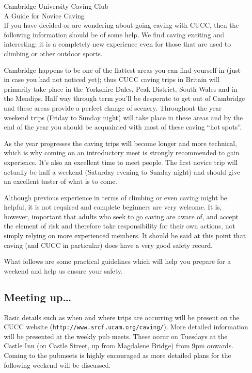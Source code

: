 \documentclass[a4paper,11pt]{article}
\begin{document}
{\titlefontsmall Cambridge University Caving Club}\smallskip\\
{\titlefont A Guide for Novice Caving}\medskip\\

If you have decided or are wondering about going caving with CUCC, then the
following information should be of some help.  We find caving exciting and
interesting; it is a completely new experience even for those that are used to
climbing or other outdoor sports.

Cambridge happens to be one of the flattest areas you can find yourself in
(just in case you had not noticed yet); thus CUCC caving trips in Britain will
primarily take place in the Yorkshire Dales, Peak District, South Wales and in
the Mendips.  Half way through term you'll be desperate to get out of Cambridge
and these areas provide a perfect change of scenery.  Throughout the year
weekend trips (Friday to Sunday night) will take place in these areas
and by the end of the year you should be acquainted with most of these caving
``hot spots''.

As the year progresses the caving trips will become longer and more technical,
which is why coming on an introductory meet is strongly recommended to gain
experience.  It's also an excellent time to meet people. The first novice trip
will actually be half a weekend (Saturday evening to Sunday night) and should
give an excellent taster of what is to come.

Although previous experience in terms of climbing or even caving might be
helpful, it is not required and complete beginners are very welcome.  It is,
however, important that adults who seek to go caving are aware of, and accept
the element of risk and therefore take responsibility for their own actions,
not simply relying on more experienced members.  It should be said at this point
that caving (and CUCC in particular) does have a very good safety record.

What follows are some practical guidelines which will help you prepare for a
weekend and help us ensure your safety.

\subsection*{Meeting up\ldots}

Basic details such as when and where trips are occurring will be present on the
CUCC website ({\tt http://www.srcf.ucam.org/caving/}).  More detailed information will
be presented at the weekly pub meets.  These occur on Tuesdays at the Castle
Inn (on Castle Street, up from Magdalene Bridge) from 9pm onwards.  Coming
to the pubmeets is highly encouraged as more detailed plans for the following
weekend will be discussed.
\end{document}

